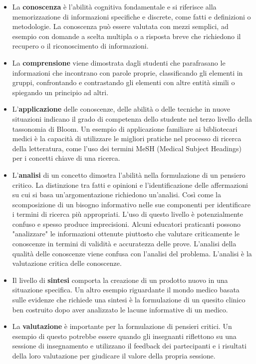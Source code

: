 \begin{itemize}
  \item La \textbf{conoscenza} è l'abilità cognitiva fondamentale e si riferisce alla memorizzazione di informazioni specifiche e discrete, come fatti e definizioni o metodologie.  La conoscenza può essere valutata con mezzi semplici, ad esempio con domande a scelta multipla o a risposta breve che richiedono il recupero o il riconoscimento di informazioni.

  \item La \textbf{comprensione} viene dimostrata dagli studenti che parafrasano le informazioni che incontrano con parole proprie, classificando gli elementi in gruppi, confrontando e contrastando gli elementi con altre entità simili o spiegando un principio ad altri.

  \item L'\textbf{applicazione} delle conoscenze, delle abilità o delle tecniche in nuove situazioni indicano il grado di competenza dello studente nel terzo livello della tassonomia di Bloom. Un esempio di applicazione familiare ai bibliotecari medici è la capacità di utilizzare le migliori pratiche nel processo di ricerca della letteratura, come l'uso dei termini MeSH (Medical Subject Headings) per i concetti chiave di una ricerca.

  \item L'\textbf{analisi} di un concetto dimostra l'abilità nella formulazione di un pensiero critico. La distinzione tra fatti e opinioni e l'identificazione delle affermazioni su cui si basa un'argomentazione richiedono un'analisi. Così come la scomposizione di un bisogno informativo nelle sue componenti per identificare i termini di ricerca più appropriati.  L'uso di questo livello è potenzialmente confuso e spesso produce imprecisioni. Alcuni educatori praticanti possono "analizzare" le informazioni ottenute piuttosto che valutare criticamente le conoscenze in termini di validità e accuratezza delle prove. L'analisi della qualità delle conoscenze viene confusa con l'analisi del problema. L'analisi è la valutazione critica delle conoscenze.

  \item Il livello di \textbf{sintesi} comporta la creazione di un prodotto nuovo in una situazione specifica. Un altro esempio riguardante il mondo medico basata sulle evidenze che richiede una sintesi è la formulazione di un quesito clinico ben costruito dopo aver analizzato le lacune informative di un medico.

  \item La \textbf{valutazione} è importante per la formulazione di pensieri critici. Un esempio di questo potrebbe essere quando gli insegnanti riflettono su una sessione di insegnamento e utilizzano il feedback dei partecipanti e i risultati della loro valutazione per giudicare il valore della propria sessione.
\end{itemize}
